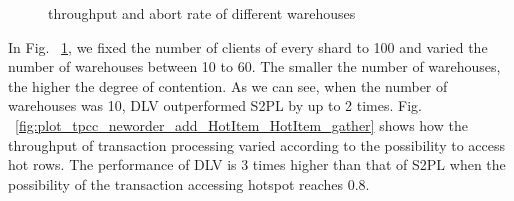 \documentclass[conference]{IEEEtran}
\begin{document}
\begin{figure}[htbp]
  \centering
  
      

\caption{throughput and abort rate of different warehouses}
\label{fig:plot_tpcc_neworder_add_Warehouse_Warehouse_gather}
\end{figure}

In Fig. ~\ref{fig:plot_tpcc_neworder_add_Warehouse_Warehouse_gather}, we fixed the number of clients of every shard to 100 and varied the number of warehouses between 10 to 60.
The smaller the number of warehouses, the higher the degree of contention. 
As we can see, when the number of warehouses was 10, DLV outperformed S2PL by up to 2 times.
Fig. ~\ref{fig:plot_tpcc_neworder_add_HotItem_HotItem_gather} shows how the throughput of transaction processing varied according to the possibility to access hot rows.
The performance of DLV is 3 times higher than that of S2PL when the possibility of the transaction accessing hotspot reaches 0.8.
\end{document}
